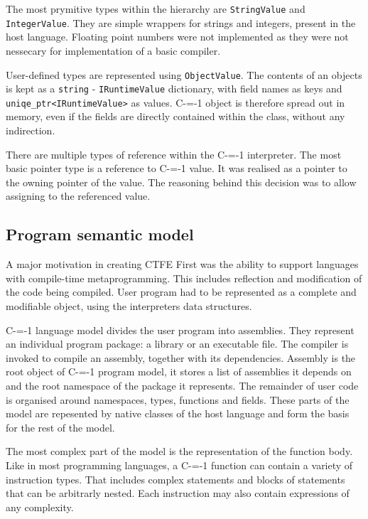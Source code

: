 The most prymitive types within the hierarchy are \lstinline{StringValue} and \lstinline{IntegerValue}.
They are simple wrappers for strings and integers, present in the host language.
Floating point numbers were not implemented as they were not nessecary for implementation of a basic compiler.

User-defined types are represented using \lstinline{ObjectValue}.
The contents of an objects is kept as a \lstinline{string} - \lstinline{IRuntimeValue} dictionary, with field names as keys and \lstinline{uniqe_ptr<IRuntimeValue>} as values.
C-=-1 object is therefore spread out in memory, even if the fields are directly contained within the class, without any indirection.


There are multiple types of reference within the C-=-1 interpreter.
The most basic pointer type is a reference to C-=-1 value.
It was realised as a pointer to the owning pointer of the value.
The reasoning behind this decision was to allow assigning to the referenced value.

\subsection{Program semantic model}
\label{semantic_model}

A major motivation in creating CTFE First was the ability to support languages with compile-time metaprogramming.
This includes reflection and modification of the code being compiled.
User program had to be represented as a complete and modifiable object, using the interpreters data structures.

C-=-1 language model divides the user program into assemblies.
They represent an individual program package: a library or an executable file.
The compiler is invoked to compile an assembly, together with its dependencies.
Assembly is the root object of C-=-1 program model, it stores a list of assemblies it depends on and the root namespace of the package it represents.
The remainder of user code is organised around namespaces, types, functions and fields.
These parts of the model are repesented by native classes of the host language and form the basis for the rest of the model.

The most complex part of the model is the representation of the function body.
Like in most programming languages, a C-=-1 function can contain a variety of instruction types.
That includes complex statements and blocks of statements that can be arbitrarly nested.
Each instruction may also contain expressions of any complexity.

